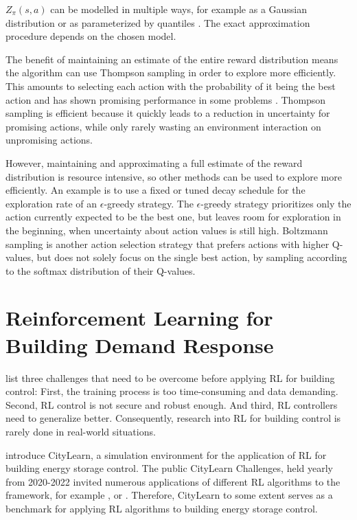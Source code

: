 $Z_\pi(s,a)$ can be modelled in multiple ways, for example as a Gaussian distribution \citep{azizzadenesheli2018EfficientExplorationBayesian} or as parameterized by quantiles \citep{dabney2018DistributionalReinforcementLearning}.
The exact approximation procedure depends on the chosen model.

The benefit of maintaining an estimate of the entire reward distribution means the algorithm can use Thompson sampling \citep{thompson1933LikelihoodThatOne} in order to explore more efficiently.
This amounts to selecting each action with the probability of it being the best action and has shown promising performance in some problems \citep{osband2013MoreEfficientReinforcement}.
Thompson sampling is efficient because it quickly leads to a reduction in uncertainty for promising actions, while only rarely wasting an environment interaction on unpromising actions.

However, maintaining and approximating a full estimate of the reward distribution is resource intensive, so other methods can be used to explore more efficiently.
An example is to use a fixed or tuned decay schedule for the exploration rate of an $\epsilon$-greedy strategy.
The $\epsilon$-greedy strategy prioritizes only the action currently expected to be the best one, but leaves room for exploration in the beginning, when uncertainty about action values is still high.
Boltzmann sampling is another action selection strategy that prefers actions with higher Q-values, but does not solely focus on the single best action, by sampling according to the softmax distribution of their Q-values.

\section{Reinforcement Learning for Building Demand Response}
\cite{wang2020ReinforcementLearningBuilding} list three challenges that need to be overcome before applying RL for building control:
First, the training process is too time-consuming and data demanding.
Second, RL control is not secure and robust enough.
And third, RL controllers need to generalize better.
Consequently, research into RL for building control is rarely done in real-world situations.

\cite{vazquez-canteli2020CityLearnStandardizingResearch} introduce CityLearn, a simulation environment for the application of RL for building energy storage control.
The public CityLearn Challenges, held yearly from 2020-2022 invited numerous applications of different RL algorithms to the framework, for example \cite{deltetto2021ExploringPotentialitiesDeep}, \cite{pinto2022EnhancingEnergyManagement} or \cite{schreiber2020ApplicationTwoPromising}.
Therefore, CityLearn to some extent serves as a benchmark for applying RL algorithms to building energy storage control.


